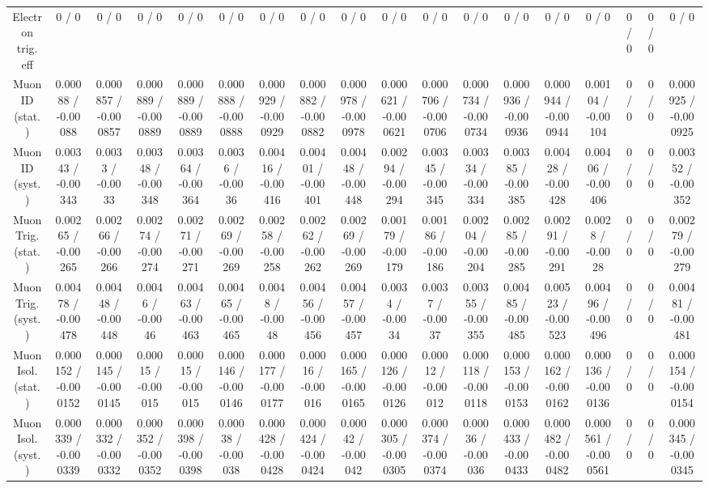 \documentclass[10pt]{article}
\begin{document}
\begin{table}[htbp]
\begin{center}
\begin{tabular}{|c|c|c|c|c|c|c|c|c|c|c|c|c|c|c|c|c|c|}
  Electron trig. eff & 0 / 0 & 0 / 0 & 0 / 0 & 0 / 0 & 0 / 0 & 0 / 0 & 0 / 0 & 0 / 0 & 0 / 0 & 0 / 0 & 0 / 0 & 0 / 0 & 0 / 0 & 0 / 0 & 0 / 0 & 0 / 0 & 0 / 0 \\ 
  Muon ID (stat.) & 0.00088 / -0.00088 & 0.000857 / -0.000857 & 0.000889 / -0.000889 & 0.000889 / -0.000889 & 0.000888 / -0.000888 & 0.000929 / -0.000929 & 0.000882 / -0.000882 & 0.000978 / -0.000978 & 0.000621 / -0.000621 & 0.000706 / -0.000706 & 0.000734 / -0.000734 & 0.000936 / -0.000936 & 0.000944 / -0.000944 & 0.00104 / -0.00104 & 0 / 0 & 0 / 0 & 0.000925 / -0.000925 \\ 
  Muon ID (syst.) & 0.00343 / -0.00343 & 0.0033 / -0.0033 & 0.00348 / -0.00348 & 0.00364 / -0.00364 & 0.0036 / -0.0036 & 0.00416 / -0.00416 & 0.00401 / -0.00401 & 0.00448 / -0.00448 & 0.00294 / -0.00294 & 0.00345 / -0.00345 & 0.00334 / -0.00334 & 0.00385 / -0.00385 & 0.00428 / -0.00428 & 0.00406 / -0.00406 & 0 / 0 & 0 / 0 & 0.00352 / -0.00352 \\ 
  Muon Trig. (stat.) & 0.00265 / -0.00265 & 0.00266 / -0.00266 & 0.00274 / -0.00274 & 0.00271 / -0.00271 & 0.00269 / -0.00269 & 0.00258 / -0.00258 & 0.00262 / -0.00262 & 0.00269 / -0.00269 & 0.00179 / -0.00179 & 0.00186 / -0.00186 & 0.00204 / -0.00204 & 0.00285 / -0.00285 & 0.00291 / -0.00291 & 0.0028 / -0.0028 & 0 / 0 & 0 / 0 & 0.00279 / -0.00279 \\ 
  Muon Trig. (syst.) & 0.00478 / -0.00478 & 0.00448 / -0.00448 & 0.0046 / -0.0046 & 0.00463 / -0.00463 & 0.00465 / -0.00465 & 0.0048 / -0.0048 & 0.00456 / -0.00456 & 0.00457 / -0.00457 & 0.0034 / -0.0034 & 0.0037 / -0.0037 & 0.00355 / -0.00355 & 0.00485 / -0.00485 & 0.00523 / -0.00523 & 0.00496 / -0.00496 & 0 / 0 & 0 / 0 & 0.00481 / -0.00481 \\ 
  Muon Isol. (stat.) & 0.000152 / -0.000152 & 0.000145 / -0.000145 & 0.00015 / -0.00015 & 0.00015 / -0.00015 & 0.000146 / -0.000146 & 0.000177 / -0.000177 & 0.00016 / -0.00016 & 0.000165 / -0.000165 & 0.000126 / -0.000126 & 0.00012 / -0.00012 & 0.000118 / -0.000118 & 0.000153 / -0.000153 & 0.000162 / -0.000162 & 0.000136 / -0.000136 & 0 / 0 & 0 / 0 & 0.000154 / -0.000154 \\ 
  Muon Isol. (syst.) & 0.000339 / -0.000339 & 0.000332 / -0.000332 & 0.000352 / -0.000352 & 0.000398 / -0.000398 & 0.00038 / -0.00038 & 0.000428 / -0.000428 & 0.000424 / -0.000424 & 0.00042 / -0.00042 & 0.000305 / -0.000305 & 0.000374 / -0.000374 & 0.00036 / -0.00036 & 0.000433 / -0.000433 & 0.000482 / -0.000482 & 0.000561 / -0.000561 & 0 / 0 & 0 / 0 & 0.000345 / -0.000345 \\ 

\end{tabular}
\end{center}
\end{table}
\end{document}
